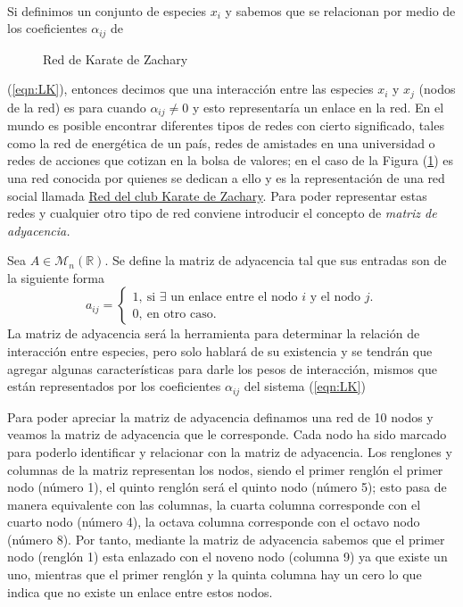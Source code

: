 \\
Si definimos un conjunto de especies $x_i$ y sabemos que se relacionan por medio de los coeficientes $\alpha_{ij}$ de 
\begin{figure} \vspace{-30pt} \begin{center}
		 
	\end{center} 
	\vspace{-20pt} 
	\caption{Red de Karate de Zachary} 
	\vspace{-20pt}
	\label{fig:RedKarate}
\end{figure} 
(\ref{eqn:LK}), entonces decimos que una interacción entre las especies $x_i$ y $x_j$ (nodos de la red) es para cuando $\alpha_{ij}\neq 0$ y esto representaría un enlace en la red. En el mundo es posible encontrar diferentes tipos de redes con cierto significado, tales como la red de energética de un país, redes de amistades en una universidad o redes de acciones que cotizan en la bolsa de valores; en el caso de la Figura (\ref{fig:RedKarate}) es una red conocida por quienes se dedican a ello y es la representación de una red social llamada \href{https://en.wikipedia.org/wiki/Zachary%27s_karate_club}{Red del club Karate de Zachary}. Para poder representar estas redes y cualquier otro tipo de red conviene introducir el concepto de \textit{matriz de adyacencia.}
\begin{definición}\label{def:matrizdeadyacencia}
	Sea $A\in\mathcal{M}_n(\mathbb{R}) $. Se define la matriz de adyacencia tal que sus entradas son de la siguiente forma
	$$a_{ij}= 
	\begin{cases}
		1, \ \text{si $\exists$ un enlace entre el nodo $i$ y el nodo $j$.}\\
		0, \ \text{en otro caso}.
	\end{cases}$$
	La matriz de adyacencia será la herramienta para determinar la relación de interacción entre especies, pero solo hablará de su existencia y se tendrán que agregar algunas características para darle los pesos de interacción, mismos que están representados por los coeficientes $\alpha_{ij}$ del sistema (\ref{eqn:LK}) 
\end{definición}
\begin{ejemplo}
	Para poder apreciar la matriz de adyacencia definamos una red de 10 nodos y veamos la matriz de adyacencia que le corresponde. Cada nodo ha sido marcado para poderlo identificar y relacionar con la matriz de adyacencia. Los renglones y columnas de la matriz representan los nodos, siendo el primer renglón el primer nodo (número 1), el quinto renglón será el quinto nodo (número 5); esto pasa de manera equivalente con las columnas, la cuarta columna corresponde con el cuarto nodo (número 4), la octava columna corresponde con el octavo nodo (número 8). Por tanto, mediante la matriz de adyacencia sabemos que el primer nodo (renglón 1) esta enlazado con el noveno nodo (columna 9) ya que existe un uno, mientras que el primer renglón y la quinta columna hay un cero lo que indica que no existe un enlace entre estos nodos. 
\end{ejemplo}
